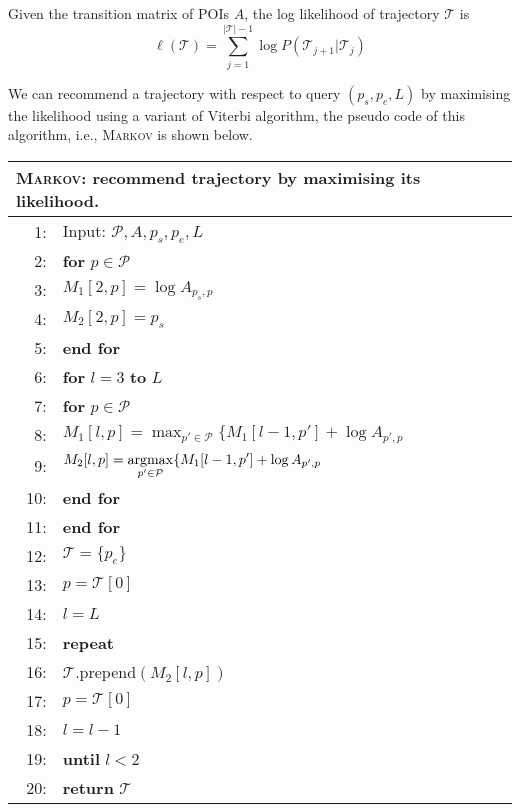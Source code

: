 Given the transition matrix of POIs $A$, the log likelihood of trajectory $\mathcal{T}$ is
\begin{displaymath}
    \ell(\mathcal{T}) = \sum_{j=1}^{|\mathcal{T}|-1} \log P(\mathcal{T}_{j+1} | \mathcal{T}_j)
\end{displaymath}

We can recommend a trajectory with respect to query $(p_s, p_e, L)$ by maximising the likelihood
using a variant of Viterbi algorithm, the pseudo code of this algorithm,
i.e., \textsc{Markov} is shown below.

\begin{table}
\centering
\small
\begin{tabular}{rl}
\hline
\multicolumn{2}{l}{\textsc{Markov}: recommend trajectory by maximising its likelihood.} \\
\hline
 1:& Input: $\mathcal{P}, A, p_s, p_e, L$ \\
 2:&\textbf{for} $p \in \mathcal{P}$ \\
 3:&\hspace{10pt} $M_1[2, p] = \log A_{p_s, p}$ \\
 4:&\hspace{10pt} $M_2[2, p] = p_s$ \\
 5:&\textbf{end for} \\
 6:&\textbf{for} $l=3$ \textbf{to} $L$ \\
 7:&\hspace{10pt}\textbf{for} $p \in \mathcal{P}$ \\
 8:&\hspace{20pt}   \(\displaystyle M_1[l, p] = \max_{p' \in \mathcal{P}} \{ M_1[l-1, p'] + \log A_{p', p} \) \\
 9:&\hspace{20pt}   \(\displaystyle M_2[l, p] = \operatorname*{argmax}_{p' \in \mathcal{P}} \{ M_1[l-1, p'] + \log A_{p', p} \) \\
10:&\hspace{10pt}\textbf{end for} \\
11:&\textbf{end for} \\
12:&$\mathcal{T} = \{p_e\}$ \\
13:&$p = \mathcal{T}[0]$ \\
14:&$l = L$ \\
15:&\textbf{repeat} \\
16:&\hspace{10pt}$\mathcal{T}$.prepend$(M_2[l, p])$ \\
17:&\hspace{10pt}$p = \mathcal{T}[0]$ \\
18:&\hspace{10pt}$l = l - 1$ \\
19:&\textbf{until} $l < 2$ \\
20:&\textbf{return} $\mathcal{T}$ \\
\hline
\end{tabular}
\end{table}


